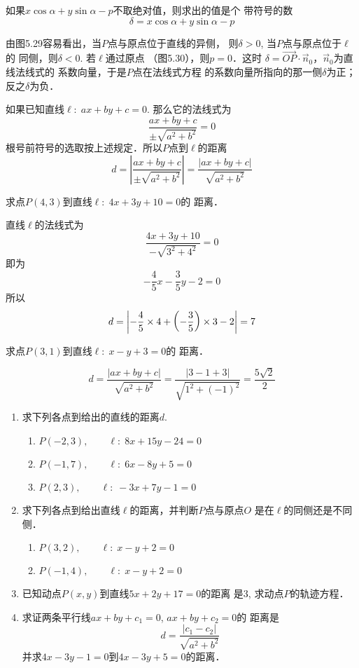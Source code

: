 如果$x\cos\alpha+y\sin\alpha-p$不取绝对值，则求出的值是个
带符号的数
\[\delta=x\cos\alpha+y\sin\alpha-p\]

由图5.29容易看出，当$P$点与原点位于直线的异侧，
则$\delta>0$, 当$P$点与原点位于$\ell$的
同侧，则$\delta <0$. 若$\ell$通过原点
（图5.30），则$p=0$．这时
$\delta=\Vec{OP}\cdot \vec{n}_0$，$\vec{n}_0$为直线法线式的
系数向量，于是$P$点在法线式方程
的系数向量所指向的那一侧$\delta$为正；反之$\delta$为负．

如果已知直线$\ell:\; ax+by+c=0$. 那么它的法线式为
\[\frac{ax+by+c}{\pm\sqrt{a^2+b^2}}=0\]
根号前符号的选取按上述规定．所以$P$点到$\ell$的距离
\[d=\left|\frac{ax+by+c}{\pm\sqrt{a^2+b^2}}\right|=\frac{|ax+by+c|}{\sqrt{a^2+b^2}}\]

\begin{example}
求点$P(4,3)$到直线$\ell:\; 4x+3y+10=0$的
距离．
\end{example}


\begin{solution}
直线$\ell$的法线式为
\[\frac{4x+3y+10}{-\sqrt{3^2+4^2}}=0\]
即为
\[-\frac{4}{5}x-\frac{3}{5}y-2=0\]
所以
\[d=\left|-\dfrac{4}{5}\times4+\left(-\dfrac{3}{5}\right)\times3-2\right|=7\]
\end{solution}

\begin{example}
    求点$P(3,1)$到直线$\ell:\; x-y+3=0$的
距离．
\end{example}

\begin{solution}
    \[d=\frac{|ax+by+c|}{\sqrt{a^2+b^2}}=\frac{|3-1+3|}{\sqrt{1^2+(-1)^2}}=\frac{5\sqrt{2}}{2}\]
\end{solution}

\begin{ex}
\begin{enumerate}
    \item 求下列各点到给出的直线的距离$d$. 
\begin{enumerate}
    \item $P(-2,3),\qquad \ell:\; 8x+15y-24=0$
    \item $P(-1,7),\qquad  \ell:\; 6x-8y+5=0$
 \item $P(2,3),\qquad \ell:\; -3x+7y-1=0$
\end{enumerate}
\item 求下列各点到给出直线$\ell$的距离，并判断$P$点与原点$O$
是在$\ell$的同侧还是不同侧．
\begin{enumerate}
    \item $P(3,2),\qquad \ell:\; x-y+2=0$
    \item $P(-1,4),\qquad \ell:\; x-y+2=0$
\end{enumerate}

\item 已知动点$P(x,y)$到直线$5x+2y+17=0$的距离
是3, 求动点$P$的轨迹方程．
\item 求证两条平行线$ax+by+c_1=0$, $ax+by+c_2=0$的
距离是
\[d=\frac{|c_1-c_2|}{\sqrt{a^2+b^2}}\]
并求$4x-3y-1=0$到$4x-3y+5=0$的距离．
\end{enumerate}
\end{ex}


